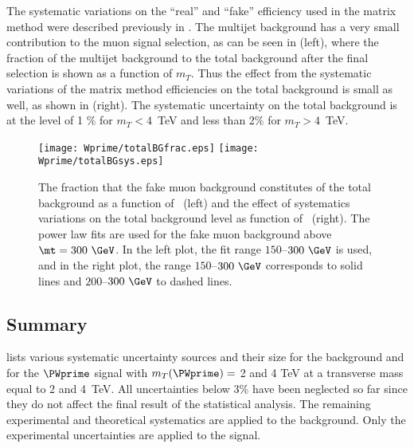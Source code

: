 The systematic variations on the ``real'' and ``fake'' efficiency used in the matrix method were
described previously in .
The multijet background has a very small contribution to the muon signal selection, as can be seen in 
 (left), where the fraction of the multijet background to the total background
after the final selection is shown as a function of $m_T$. Thus the effect from the systematic
variations of the matrix method efficiencies on the total background is small as well, as shown in
 (right). 
The systematic uncertainty on the total background is at the level of 1 $\%$ for $m_T<4$~TeV and less than 2$\%$ for $m_T>4$~TeV.

\begin{figure}[!htb]
  \centering
  \texttt{[image: Wprime/totalBGfrac.eps]}
  \texttt{[image: Wprime/totalBGsys.eps]}
  \caption{The fraction that the fake muon background constitutes of the total background
as a function of \mt\ (left) and the effect of systematics variations on the total background
level as function of \mt\ (right). The power law fits are used for the fake muon background above
$\mt=300~\GeV$. In the left plot, the fit range $150$--$300~\GeV$ is used, and in the right plot, the
range $150$--$300~\GeV$ corresponds to solid lines and $200$--$300~\GeV$ to dashed lines.}
  \label{fig:muMMfinal}
\end{figure}

\subsection{Summary}
 lists various systematic uncertainty sources
and their size for the background and for the $\PWprime$ signal with $m_T(\PWprime)=$ 2 and 4 TeV at a transverse mass equal to 2 and 4~TeV.
All uncertainties below $3$\% have been neglected so far
since they do not affect the final result of the statistical analysis. 
The remaining experimental and theoretical systematics are applied to the background.
Only the experimental uncertainties are applied to the signal. 

